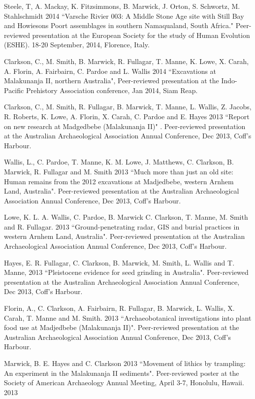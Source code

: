 \ind Steele, T, A. Mackay, K. Fitzsimmons, B. Marwick, J. Orton, S. Schwortz, M. Stahlschmidt 2014 ``Varsche Rivier 003: A Middle Stone Age site with Still Bay and Howiesons Poort assemblages in southern Namaqualand, South Africa." Peer-reviewed presentation at the European Society for the study of Human Evolution (ESHE). 18-20 September, 2014, Florence, Italy.

\ind Clarkson, C., M. Smith, B. Marwick, R. Fullagar, T. Manne, K. Lowe, X. Carah,  A. Florin, A.  Fairbairn, C. Pardoe and L. Wallis 2014 ``Excavations at Malakunanja II, northern Australia",  Peer-reviewed presentation at the Indo-Pacific Prehistory Association conference, Jan 2014, Siam Reap.

\ind Clarkson, C., M. Smith, R. Fullagar, B. Marwick, T. Manne, L. Wallis, Z. Jacobs, R. Roberts, K. Lowe, A. Florin, X. Carah, C. Pardoe and E. Hayes 2013 ``Report on new research at Madgedbebe (Malakunanja II)" . Peer-reviewed presentation at the Australian Archaeological Association Annual Conference, Dec 2013, Coff’s Harbour.

\ind Wallis, L., C. Pardoe, T. Manne, K. M. Lowe, J. Matthews, C.   Clarkson, B. Marwick, R. Fullagar and M. Smith 2013 ``Much more than just an old site: Human remains from the 2012 excavations at Madjedbebe, western Arnhem Land, Australia". Peer-reviewed presentation at the Australian Archaeological Association Annual Conference, Dec 2013, Coff’s Harbour.

\ind Lowe, K. L. A. Wallis, C. Pardoe, B. Marwick C. Clarkson, T. Manne, M. Smith and R. Fullagar. 2013 ``Ground-penetrating radar, GIS and burial practices in western Arnhem Land, Australia". Peer-reviewed presentation at the Australian Archaeological Association Annual Conference, Dec 2013, Coff’s Harbour.

\ind Hayes, E.  R. Fullagar, C. Clarkson, B. Marwick, M. Smith, L. Wallis and T. Manne, 2013 ``Pleistocene evidence for seed grinding in Australia". Peer-reviewed presentation at the Australian Archaeological Association Annual Conference, Dec 2013, Coff’s Harbour.

\ind Florin, A., C. Clarkson, A. Fairbairn, R. Fullagar, B. Marwick, L. Wallis, X. Carah, T. Manne and M. Smith. 2013 ``Archaeobotanical investigations into plant food use at Madjedbebe (Malakunanja II)". Peer-reviewed presentation at the Australian Archaeological Association Annual Conference, Dec 2013, Coff’s Harbour.

\ind Marwick, B. E. Hayes and C. Clarkson 2013 ``Movement of lithics by trampling: An experiment in the Malakunanja II sediments". Peer-reviewed poster at the Society of American Archaeology Annual Meeting, April 3-7, Honolulu, Hawaii. 2013

